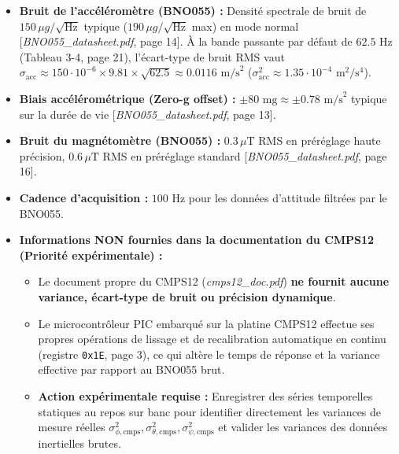 \documentclass[../Formulations_Kalman.tex]{subfiles}
\begin{document}
\begin{itemize}
    \item \textbf{Bruit de l'accéléromètre (BNO055) :} Densité spectrale de bruit de $150\,\mu g/\sqrt{\text{Hz}}$ typique ($190\,\mu g/\sqrt{\text{Hz}}$ max) en mode normal [\textit{BNO055\_datasheet.pdf}, page 14]. À la bande passante par défaut de $62.5\text{ Hz}$ (Tableau 3-4, page 21), l'écart-type de bruit RMS vaut $\sigma_{\text{acc}} \approx 150\cdot 10^{-6} \times 9.81 \times \sqrt{62.5} \approx 0.0116\text{ m/s}^2$ ($\sigma_{\text{acc}}^2 \approx 1.35\cdot 10^{-4}\text{ m}^2/\text{s}^4$).
    \item \textbf{Biais accélérométrique (Zero-g offset) :} $\pm 80\text{ mg} \approx \pm 0.78\text{ m/s}^2$ typique sur la durée de vie [\textit{BNO055\_datasheet.pdf}, page 13].
    \item \textbf{Bruit du magnétomètre (BNO055) :} $0.3\,\mu\text{T}$ RMS en préréglage haute précision, $0.6\,\mu\text{T}$ RMS en préréglage standard [\textit{BNO055\_datasheet.pdf}, page 16].
    \item \textbf{Cadence d'acquisition :} $100\text{ Hz}$ pour les données d'attitude filtrées par le BNO055.
    \item \textbf{Informations NON fournies dans la documentation du CMPS12 (Priorité expérimentale) :}
    \begin{itemize}
        \item Le document propre du CMPS12 (\textit{cmps12\_doc.pdf}) \textbf{ne fournit aucune variance, écart-type de bruit ou précision dynamique}.
        \item Le microcontrôleur PIC embarqué sur la platine CMPS12 effectue ses propres opérations de lissage et de recalibration automatique en continu (registre \texttt{0x1E}, page 3), ce qui altère le temps de réponse et la variance effective par rapport au BNO055 brut.
        \item \textbf{Action expérimentale requise :} Enregistrer des séries temporelles statiques au repos sur banc pour identifier directement les variances de mesure réelles $\sigma_{\phi,\text{cmps}}^2, \sigma_{\theta,\text{cmps}}^2, \sigma_{\psi,\text{cmps}}^2$ et valider les variances des données inertielles brutes.
    \end{itemize}
\end{itemize}
\end{document}
